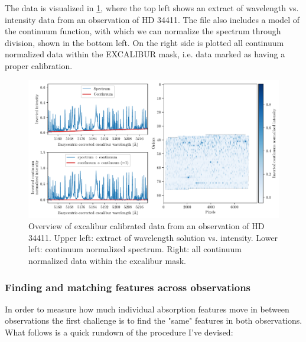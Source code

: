     The data is visualized in \ref{fig:rv_data_overview}, where the top left shows an extract of wavelength vs. intensity data from an observation of HD 34411. The file also includes a model of the continuum function, with which we can normalize the spectrum through division, shown in the bottom left. On the right side is plotted all continuum normalized data within the EXCALIBUR mask, i.e. data marked as having a proper calibration.

    \begin{figure}%
        \begin{wide}  
            \includegraphics[width=\textwidth]{figures/rv_data_overview.pdf}
            \caption{Overview of excalibur calibrated data from an observation of HD 34411. Upper left: extract of wavelength solution vs. intensity. Lower left: continuum normalized spectrum. Right: all continuum normalized data within the excalibur mask.}
            \label{fig:rv_data_overview}
        \end{wide}
    \end{figure}
            
    \subsubsection{Finding and matching features across observations}

    In order to measure how much individual absorption features move in between observations the first challenge is to find the "same" features in both observations. What follows is a quick rundown of the procedure I've devised:
    

